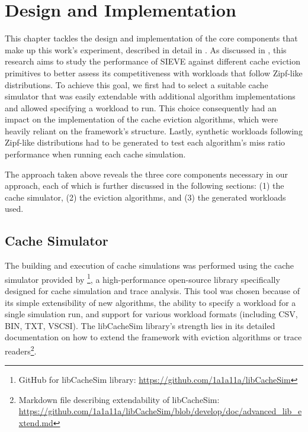 \chapter{Design and Implementation}\label{chapter:design}

 


This chapter tackles the design and implementation of the core components that make up this work's experiment, described in detail in . As discussed in , this research aims to study the performance of SIEVE against different cache eviction primitives to better assess its competitiveness with workloads that follow Zipf-like distributions. To achieve this goal, we first had to select a suitable cache simulator that was easily extendable with additional algorithm implementations and allowed specifying a workload to run. This choice consequently had an impact on the implementation of the cache eviction algorithms, which were heavily reliant on the framework's structure. Lastly, synthetic workloads following Zipf-like distributions had to be generated to test each algorithm's miss ratio performance when running each cache simulation. 

The approach taken above reveals the three core components necessary in our approach, each of which is further discussed in the following sections: (1) the cache simulator, (2) the eviction algorithms,  and (3) the generated workloads used.


\section{Cache Simulator}\label{sec: cache-simulations}


The building and execution of cache simulations was performed using the cache simulator provided by \footnote{GitHub for libCacheSim library: \url{https://github.com/1a1a11a/libCacheSim}}, a high-performance open-source library specifically designed for cache simulation and trace analysis. This tool was chosen because of its simple extensibility of new algorithms, the ability to specify a workload for a single simulation run, and support for various workload formats (including CSV, BIN, TXT, VSCSI). The libCacheSim library's strength lies in its detailed documentation on how to extend the framework with eviction algorithms or trace readers\footnote{Markdown file describing extendability of libCacheSim: \url{https://github.com/1a1a11a/libCacheSim/blob/develop/doc/advanced_lib_extend.md}}.


